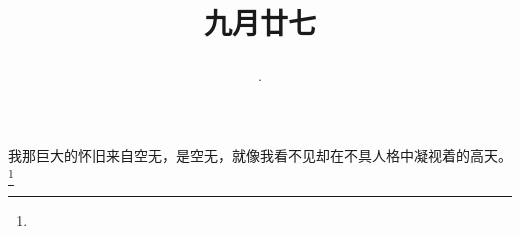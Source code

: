 \title{\date[d=29,m=10,y=2024][year:cn-y,年,month:cn,day:cn,日,·,weekday]·九月廿七 }
我那巨大的怀旧来自空无，是空无，就像我看不见却在不具人格中凝视着的高天。\footnote{ }

